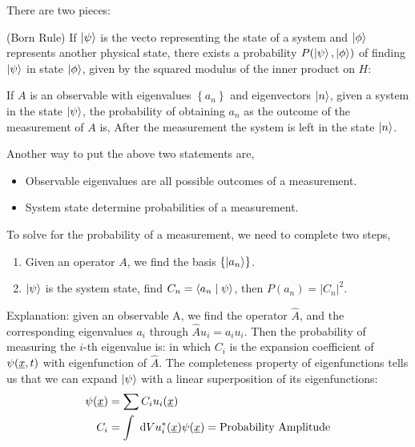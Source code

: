 \documentclass{school-22.101-notes}
\date{September 14, 2011}
\begin{document}
\maketitle


\begin{axiom}
There are two pieces:
\begin{subaxiom}
  (Born Rule) If $\left| \psi \right>$ is the vecto representing the state of a system and $\left| \phi \right>$ represents another physical state, there exists a probability $P(\left| \psi \right>, \left| \phi \right>)$ of finding $\left| \psi \right>$ in state $\left| \phi \right>$, given by the squared modulus of the inner product on $H$:
\end{subaxiom}
\begin{subaxiom}
  If $A$ is an observable with eigenvalues $\left\{ a_n \right\}$ and eigenvectors $\left| n \right>$, given a system in the state $\left| \psi \right>$, the probability of obtaining $a_n$ as the outcome of the measurement of $A$ is, 
  After the measurement the system is left in the state $\left| n \right>$.
\end{subaxiom}
\end{axiom}

Another way to put the above two  statements are, 
\begin{itemize}
\item Observable eigenvalues are all possible outcomes of a measurement. 
\item System state determine probabilities of a measurement. 
\end{itemize}

To solve for the probability of a measurement, we need to complete two steps, 
\begin{enumerate}
\item Given an operator $A$, we find the basis $\left\{ \left| a_n \right> \right\}$. 
\item $\left| \psi \right>$ is the system state, find $C_n = \langle a_n \mid \psi \rangle$, then $P(a_n) = |C_n|^2$. 
\end{enumerate}
Explanation: given an observable A, we find the operator $\hat{A}$, and the corresponding eigenvalues $a_i$ through $\hat{A} u_i = a_i u_i$. Then the probability of measuring the $i$-th eigenvalue is:
in which $C_i$ is the expansion coefficient of $\psi(\underline{x}, t)$ with eigenfunction of $\hat{A}$. The completeness property of eigenfunctions tells us that we can expand $\left| \psi \right>$ with a linear superposition of its eigenfunctions:
\begin{align}
\psi(\underline{x}) &= \displaystyle\sum C_i u_i (\underline{x}) \\
C_i &= \int \mbox{ }\mathrm{d} V u_i^* (\underline{x}) \psi(\underline{x}) = \mbox{Probability Amplitude}
\end{align}
\end{document}
